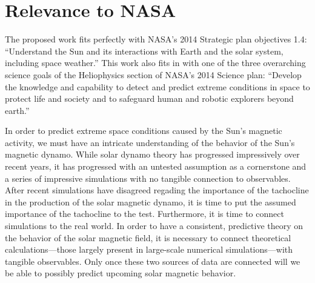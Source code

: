\documentclass[aasms,12pt]{article}
\begin{document}
\section{Relevance to NASA} 
The proposed work fits perfectly with NASA's 2014 Strategic plan objectives
1.4:
``Understand the Sun and its interactions with Earth and the solar
system, including space weather.''
This work also fits in with one of the three overarching science goals
of the Heliophysics section of NASA's 2014 Science plan: 
``Develop the
knowledge and capability to detect and predict extreme conditions in space to
protect life and society and to safeguard human and robotic explorers beyond
earth.''

In order to predict extreme space conditions caused by the Sun's magnetic
activity, we must have an intricate understanding of the behavior of the Sun's
magnetic dynamo.  While solar dynamo theory has progressed impressively over
recent years, it has progressed with an untested assumption as a cornerstone
and a series of impressive simulations with no tangible connection to
observables.  After recent simulations have disagreed regading the importance
of the tachocline in the production of the solar magnetic dynamo, it is time
to put the assumed importance of the tachocline to the test.  Furthermore,
it is time to connect simulations to the real world.  In order to have a
consistent, predictive theory on the behavior of the solar magnetic field, it
is necessary to connect theoretical calculations---those largely present in
large-scale numerical simulations---with tangible observables.  Only once these
two sources of data are connected will we be able to possibly predict upcoming
solar magnetic behavior.



\nocite{*}

\begingroup
\renewcommand{\section}[2]{}%
\begin{footnotesize}

\end{footnotesize}
\endgroup
\end{document}
